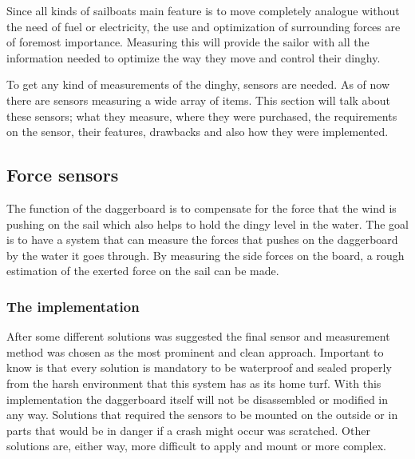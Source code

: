 Since all kinds of sailboats main feature is to move completely analogue without the need of fuel or electricity, the use and optimization of surrounding forces are of foremost importance. Measuring this will provide the sailor with all the information needed to optimize the way they move and control their dinghy.

To get any kind of measurements of the dinghy, sensors are needed. As of now there are sensors measuring a wide array of items. This section will talk about these sensors; what they measure, where they were purchased, the requirements on the sensor, their features, drawbacks and also how they were implemented.

\subsection{Force sensors}
The function of the daggerboard is to compensate for the force that the wind is pushing on the sail which also helps to hold the dingy level in the water. The goal is to have a system that can measure the forces that pushes on the daggerboard by the water it goes through. By measuring the side forces on the board, a rough estimation of the exerted force on the sail can be made.  

\subsubsection{The implementation}

After some different solutions was suggested the final sensor and measurement method was chosen as the most prominent and clean approach. 
Important to know is that every solution is mandatory to be waterproof and sealed properly from the harsh environment that this system has as its home turf. 
With this implementation the daggerboard itself will not be disassembled or modified in any way. 
Solutions that required the sensors to be mounted on the outside or in parts that would be in danger if a crash might occur was scratched.  
Other solutions are, either way, more difficult to apply and mount or more complex.  

